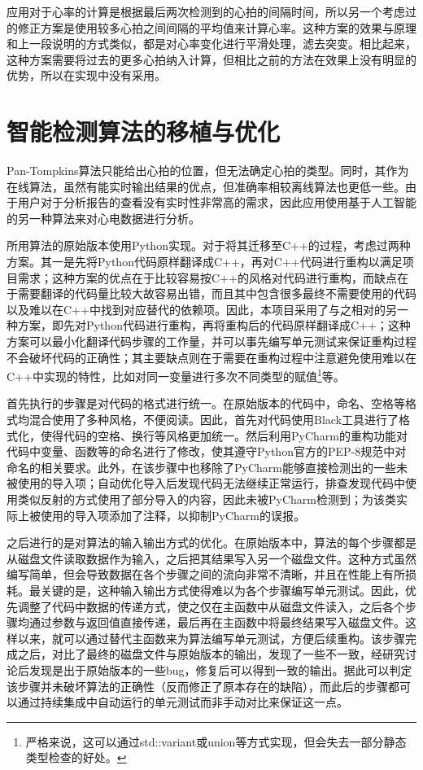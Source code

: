 应用对于心率的计算是根据最后两次检测到的心拍的间隔时间，所以另一个考虑过的修正方案是使用较多心拍之间间隔的平均值来计算心率。这种方案的效果与原理和上一段说明的方式类似，都是对心率变化进行平滑处理，滤去突变。相比起来，这种方案需要将过去的更多心拍纳入计算，但相比之前的方法在效果上没有明显的优势，所以在实现中没有采用。


\section{智能检测算法的移植与优化}\label{sec:ai}

Pan-Tompkins算法只能给出心拍的位置，但无法确定心拍的类型。同时，其作为在线算法，虽然有能实时输出结果的优点，但准确率相较离线算法也更低一些。由于用户对于分析报告的查看没有实时性非常高的需求，因此应用使用基于人工智能的另一种算法来对心电数据进行分析。

所用算法的原始版本使用Python实现。对于将其迁移至C++的过程，考虑过两种方案。其一是先将Python代码原样翻译成C++，再对C++代码进行重构以满足项目需求；这种方案的优点在于比较容易按C++的风格对代码进行重构，而缺点在于需要翻译的代码量比较大故容易出错，而且其中包含很多最终不需要使用的代码以及难以在C++中找到对应替代的依赖项。因此，本项目采用了与之相对的另一种方案，即先对Python代码进行重构，再将重构后的代码原样翻译成C++；这种方案可以最小化翻译代码步骤的工作量，并可以事先编写单元测试来保证重构过程不会破坏代码的正确性；其主要缺点则在于需要在重构过程中注意避免使用难以在C++中实现的特性，比如对同一变量进行多次不同类型的赋值\footnote{严格来说，这可以通过std::variant或union等方式实现，但会失去一部分静态类型检查的好处。}等。

首先执行的步骤是对代码的格式进行统一。在原始版本的代码中，命名、空格等格式均混合使用了多种风格，不便阅读。因此，首先对代码使用Black工具进行了格式化，使得代码的空格、换行等风格更加统一。然后利用PyCharm的重构功能对代码中变量、函数等的命名进行了修改，使其遵守Python官方的PEP-8规范中对命名的相关要求。此外，在该步骤中也移除了PyCharm能够直接检测出的一些未被使用的导入项；自动优化导入后发现代码无法继续正常运行，排查发现代码中使用类似反射的方式使用了部分导入的内容，因此未被PyCharm检测到；为该类实际上被使用的导入项添加了注释，以抑制PyCharm的误报。

之后进行的是对算法的输入输出方式的优化。在原始版本中，算法的每个步骤都是从磁盘文件读取数据作为输入，之后把其结果写入另一个磁盘文件。这种方式虽然编写简单，但会导致数据在各个步骤之间的流向非常不清晰，并且在性能上有所损耗。最关键的是，这种输入输出方式使得难以为各个步骤编写单元测试。因此，优先调整了代码中数据的传递方式，使之仅在主函数中从磁盘文件读入，之后各个步骤均通过参数与返回值直接传递，最后再在主函数中将最终结果写入磁盘文件。这样以来，就可以通过替代主函数来为算法编写单元测试，方便后续重构。该步骤完成之后，对比了最终的磁盘文件与原始版本的输出，发现了一些不一致，经研究讨论后发现是出于原始版本的一些bug，修复后可以得到一致的输出。据此可以判定该步骤并未破坏算法的正确性（反而修正了原本存在的缺陷），而此后的步骤都可以通过持续集成中自动运行的单元测试而非手动对比来保证这一点。

